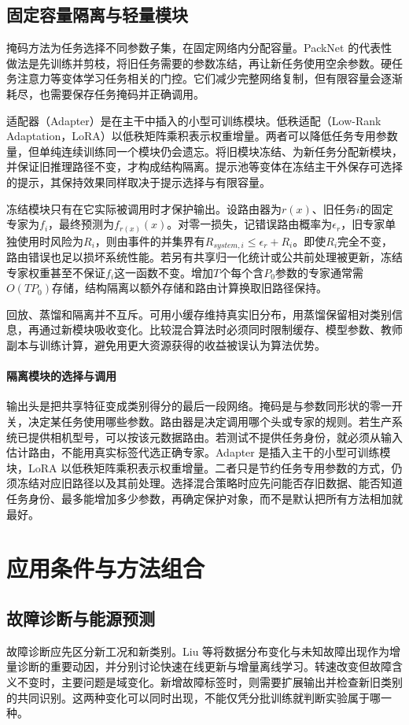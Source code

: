 \subsection{固定容量隔离与轻量模块}
掩码方法为任务选择不同参数子集，在固定网络内分配容量。PackNet 的代表性做法是先训练并剪枝，将旧任务需要的参数冻结，再让新任务使用空余参数。硬任务注意力等变体学习任务相关的门控。它们减少完整网络复制，但有限容量会逐渐耗尽，也需要保存任务掩码并正确调用。

适配器（Adapter）是在主干中插入的小型可训练模块。低秩适配（Low-Rank Adaptation，LoRA）以低秩矩阵乘积表示权重增量。两者可以降低任务专用参数量，但单纯连续训练同一个模块仍会遗忘。将旧模块冻结、为新任务分配新模块，并保证旧推理路径不变，才构成结构隔离。提示池等变体在冻结主干外保存可选择的提示，其保持效果同样取决于提示选择与有限容量。

冻结模块只有在它实际被调用时才保护输出。设路由器为$r(x)$、旧任务$i$的固定专家为$f_i$，最终预测为$f_{r(x)}(x)$。对零一损失，记错误路由概率为$\epsilon_r$，旧专家单独使用时风险为$R_i$，则由事件的并集界有$R_{system,i}\leq\epsilon_r+R_i$。即使$R_i$完全不变，路由错误也足以损坏系统性能。若另有共享归一化统计或公共前处理被更新，冻结专家权重甚至不保证$f_i$这一函数不变。增加$T$个每个含$P_0$参数的专家通常需$O(TP_0)$存储，结构隔离以额外存储和路由计算换取旧路径保持。

回放、蒸馏和隔离并不互斥。可用小缓存维持真实旧分布，用蒸馏保留相对类别信息，再通过新模块吸收变化。比较混合算法时必须同时限制缓存、模型参数、教师副本与训练计算，避免用更大资源获得的收益被误认为算法优势。

\paragraph{隔离模块的选择与调用}
输出头是把共享特征变成类别得分的最后一段网络。掩码是与参数同形状的零一开关，决定某任务使用哪些参数。路由器是决定调用哪个头或专家的规则。若生产系统已提供相机型号，可以按该元数据路由。若测试不提供任务身份，就必须从输入估计路由，不能用真实标签代选正确专家。Adapter 是插入主干的小型可训练模块，LoRA 以低秩矩阵乘积表示权重增量。二者只是节约任务专用参数的方式，仍须冻结对应旧路径以及其前处理。选择混合策略时应先问能否存旧数据、能否知道任务身份、最多能增加多少参数，再确定保护对象，而不是默认把所有方法相加就最好。

\section{应用条件与方法组合}
\subsection{故障诊断与能源预测}
故障诊断应先区分新工况和新类别。Liu 等将数据分布变化与未知故障出现作为增量诊断的重要动因，并分别讨论快速在线更新与增量离线学习\cite{liu2025incrementalfd}。转速改变但故障含义不变时，主要问题是域变化。新增故障标签时，则需要扩展输出并检查新旧类别的共同识别。这两种变化可以同时出现，不能仅凭分批训练就判断实验属于哪一种。

